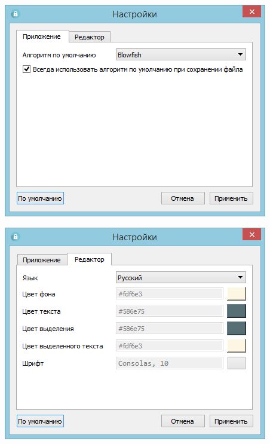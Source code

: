 \noindent
\begin{minipage}{\linewidth}
  \vspace{3.5mm}
  \centering
  \includegraphics[scale=0.6]{./pics/te/app-settings-window-1.png}
  \label{fig:app-settings-window-1}
  \vspace{3.5mm}
\end{minipage}

\noindent
\begin{minipage}{\linewidth}
  \vspace{3.5mm}
  \centering
  \includegraphics[scale=0.6]{./pics/te/app-settings-window-2.png}
  \label{fig:app-settings-window-2}
  \vspace{3.5mm}
\end{minipage}

